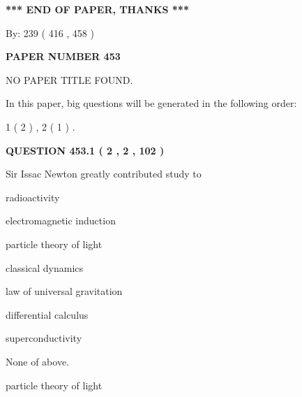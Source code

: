 \documentclass[12pt]{article}
\begin{document}
   
\vspace{1.0in} 
{\textbf{\large{ *** END OF PAPER, THANKS *** }}} 
   
   
\hspace{1.0in} By: 
 239 ( 416 ,  458 )
   
   
   
   
\newpage 
\setcounter{page}{ 
   453001 } 
   
   
   
   
 {\textbf{ \Large{ PAPER NUMBER  453  }}}
   
   
\vspace{0.2in}
   
   
   
   
   
   
 NO PAPER TITLE FOUND.
   
   
   
\vspace{0.2in}
   
In this paper, big questions will be generated in the following order: 
   
   
   1 ( 2 )
 ,
   2 ( 1 )
 .
  
\vspace{0.2in}
  
{\textbf{\Large{QUESTION
453.1 
 ( 2 , 2 , 102 )
}}}
  
  
Sir Issac Newton greatly contributed study to
 
 
radioactivity
 
 
electromagnetic induction
 
 
particle theory of light
 
 
classical dynamics
 
 
law of universal gravitation
 
 
differential calculus
 
 
superconductivity
 
 
 None of above.
 
 
\noindent{}
 
 
particle theory of light
 
\end{document}
